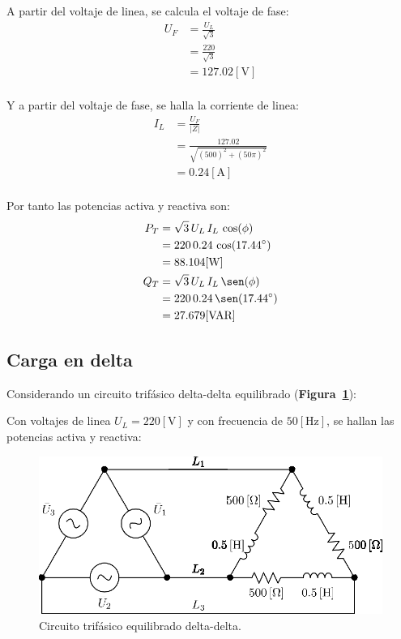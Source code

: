 \documentclass[letter,11pt]{article}
\begin{document}
A partir del voltaje de linea, se calcula el voltaje de fase:
\begin{equation*}
    \begin{split}
        U_F &= \frac{U_L}{\sqrt{3}}\\
            &= \frac{220}{\sqrt{3}}\\
            &= 127.02[\text{V}]\\
    \end{split}
\end{equation*}

Y a partir del voltaje de fase, se halla la corriente de linea:
\begin{equation*}
    \begin{split}
        I_L &= \frac{U_F}{|Z|}\\
            &= \frac{127.02}{\sqrt{(500)^2+(50\pi)^2}}\\
            &= 0.24[\text{A}]\\
    \end{split}
\end{equation*}

Por tanto las potencias activa y reactiva son:
\begin{equation*}
    \begin{split}
        P_T &= \sqrt{3}\,U_L\,I_L\,\cos(\phi)\\
            &= 220\,0.24\,\cos(17.44^{\circ})\\
            &= 88.104[\text{W}]\\
        Q_T &= \sqrt{3}\,U_L\,I_L\,\sen(\phi)\\
            &= 220\,0.24\,\sen(17.44^{\circ})\\
            &= 27.679[\text{VAR}]\\
    \end{split}
\end{equation*}

\subsection{Carga en delta}
Considerando un circuito trifásico delta-delta equilibrado
(\textbf{Figura~\ref{circuito2}}):

Con voltajes de linea $U_L=220[\text{V}]$ y con frecuencia de $50[\text{Hz}]$,
se hallan las potencias activa y reactiva:

\begin{figure}[!h]
\centering
\includegraphics[scale=0.95]{figura2.eps}
\caption{Circuito trifásico equilibrado delta-delta.}
\label{circuito2}
\end{figure}
\end{document}
